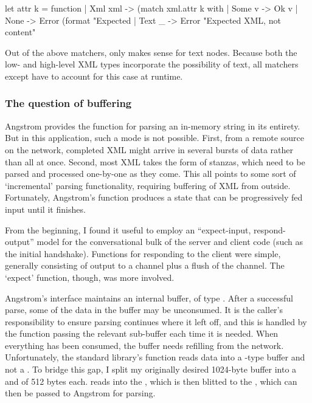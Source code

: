 \begin{ocaml}
let attr k = function
  | Xml xml -> (match xml.attr k with
    | Some v -> Ok v
    | None -> Error (format "Expected %
  | Text _ -> Error "Expected XML, not content"
\end{ocaml}

Out of the above matchers, only  makes sense for text nodes. Because both the low- and high-level XML types incorporate the possibility of text, all matchers except  have to account for this case at runtime.

\subsubsection{The question of buffering}
Angstrom provides the  function for parsing an in-memory string in its entirety. But in this application, such a mode is not possible. First, from a remote source on the network, completed XML might arrive in several bursts of data rather than all at once. Second, most XML takes the form of stanzas, which need to be parsed and processed one-by-one as they come. This all points to some sort of `incremental' parsing functionality, requiring buffering of XML from outside. Fortunately, Angstrom's  function produces a state that can be progressively fed input until it finishes.

From the beginning, I found it useful to employ an ``expect-input, respond-output'' model for the conversational bulk of the server and client code (such as the initial handshake). Functions for responding to the client were simple, generally consisting of output to a channel plus a flush of the channel. The `expect' function, though, was more involved.

Angstrom's  interface maintains an internal buffer, of type . After a successful parse, some of the data in the buffer may be unconsumed. It is the caller's responsibility to ensure parsing continues where it left off, and this is handled by the function passing the relevant sub-buffer each time it is needed. When everything has been consumed, the buffer needs refilling from the network. Unfortunately, the standard library's  function reads data into a -type buffer and not a . To bridge this gap, I split my originally desired 1024-byte buffer into a  and  of 512 bytes each.  reads into the , which is then blitted to the , which can then be passed to Angstrom for parsing.

